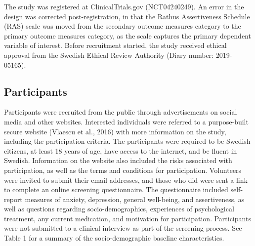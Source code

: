\documentclass[3p]{elsarticle} %
\begin{document}
The study was registered at ClinicalTrials.gov (NCT04240249). An error
in the design was corrected post-registration, in that the Rathus
Assertiveness Schedule (RAS) scale was moved from the secondary outcome
measures category to the primary outcome measures category, as the scale
captures the primary dependent variable of interest. Before recruitment
started, the study received ethical approval from the Swedish Ethical
Review Authority (Diary number: 2019-05165).

\hypertarget{participants}{%
\subsection{Participants}\label{participants}}

Participants were recruited from the public through advertisements on
social media and other websites. Interested individuals were referred to
a purpose-built secure website (Vlaescu et al., 2016) with more
information on the study, including the participation criteria. The
participants were required to be Swedish citizens, at least 18 years of
age, have access to the internet, and be fluent in Swedish. Information
on the website also included the risks associated with participation, as
well as the terms and conditions for participation. Volunteers were
invited to submit their email addresses, and those who did were sent a
link to complete an online screening questionnaire. The questionnaire
included self-report measures of anxiety, depression, general
well-being, and assertiveness, as well as questions regarding
socio-demographics, experiences of psychological treatment, any current
medication, and motivation for participation. Participants were not
submitted to a clinical interview as part of the screening process. See
Table 1 for a summary of the socio-demographic baseline characteristics.
\end{document}
